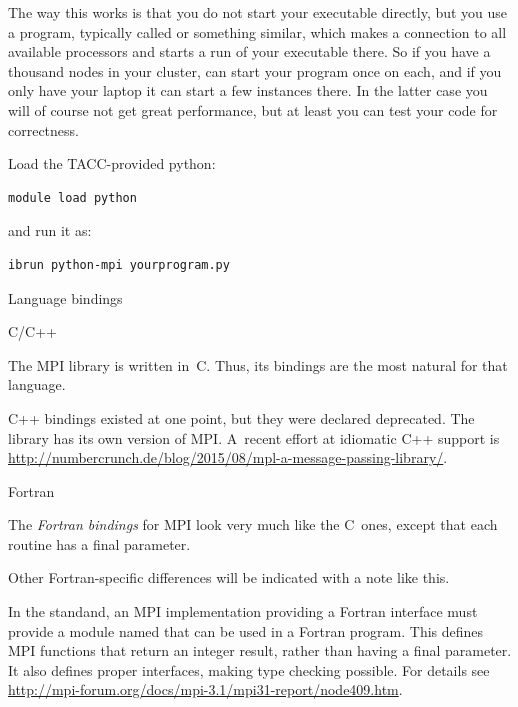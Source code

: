 The way this works is that you do not start your executable directly,
but you use a program, typically called  or
something similar, which makes a connection to all available
processors and starts a run of your executable there. So if you have a
thousand nodes in your cluster,  can start your program once
on each, and if you only have your laptop it can start a few instances
there. In the latter case you will of course not get great
performance, but at least you can test your code for correctness.

\begin{tacc}
  \begin{pythonnote}
    Load the TACC-provided python:
\begin{verbatim}
module load python
\end{verbatim}
and run it as:
\begin{verbatim}
ibrun python-mpi yourprogram.py
\end{verbatim}
  \end{pythonnote}
\end{tacc}

 {Language bindings}

 {C/C++}

The MPI library is written in~C. Thus, its bindings are the most natural
for that language.

C++ bindings existed at one point, but they were declared deprecated.
The  library has its own version of MPI.  A~recent
effort at idiomatic C++ support is 
\url{http://numbercrunch.de/blog/2015/08/mpl-a-message-passing-library/}.


 {Fortran}

The \emph{Fortran bindings} for MPI look very much like the C~ones, except that
each routine has a final  parameter.

\begin{fortrannote}
  Other Fortran-specific differences will be indicated with a note
  like this.
\end{fortrannote}

%
In the  standand,
an MPI implementation providing a Fortran interface must provide a
module named  that can be used in a Fortran program.
This defines MPI functions that return an integer result, rather than
having a final parameter. It also defines proper interfaces, making
type checking possible. For details see \url{http://mpi-forum.org/docs/mpi-3.1/mpi31-report/node409.htm}.
%

